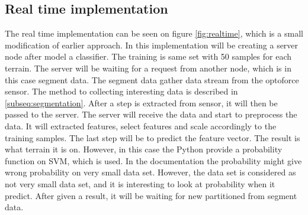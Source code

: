 \documentclass[USenglish]{ifimaster}  %
\begin{document}
\subsection{Real time implementation}
The real time implementation can be seen on figure \ref{fig:realtime}, which is a small modification of earlier approach. In this implementation will be creating a server node after model a classifier. The training is same set with 50 samples for each terrain. The server will be waiting for a request from another node, which is in this case segment data. The segment data gather data stream from the optoforce sensor. The method to collecting interesting data is described in \ref{subseq:segmentation}. After a step is extracted from sensor, it will then be passed to the server. The server will receive the data and start to preprocess the data. It will extracted features, select features and scale accordingly to the training samples. The last step will be to predict the feature vector. The result is what terrain it is on. However, in this case the Python provide a probability function on SVM, which is used. In the documentation the probability might give wrong probability on very small data set. However, the data set is considered as not very small data set, and it is interesting to look at probability when it predict. After given a result, it will be waiting for new partitioned from segment data. 
	
\end{document}
